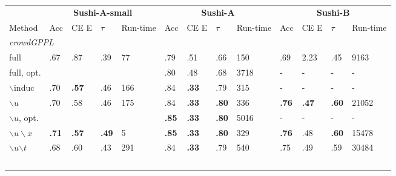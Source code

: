 \begin{table}
\small
\begin{tabularx}{\textwidth}{| p{1.1cm} | X | X | X | p{0.55cm} | X | X | X | p{0.7cm} | X | X | X | p{0.7cm} |}
\hline
& \multicolumn{4}{c|}{\textbf{Sushi-A-small}} & \multicolumn{4}{c|}{\textbf{Sushi-A}} & \multicolumn{4}{c|}{\textbf{Sushi-B}} \\ 
Method & Acc & CE E & $\tau$ & Run-time & Acc & CE E & $\tau$ & Run-time & Acc & CE E & $\tau$ & Run-time \\
\hline\hline
\multicolumn{13}{|l|}{\textit{crowdGPPL}} \\
full & .67 & .87 & .39 & 77%
& .79 & .51 & .66 & 150%
& .69 & 2.23 & .45 & 9163 
\\
full, opt. & & & & & .80 & .48 & .68 & 3718 
& - & - & - & - 
\\%
$\backslash $induc & .70 & \textbf{.57} & .46 & 166 %
& .84 & \textbf{.33} & .79 & 315 %
& - & - & - & -
\\
$\backslash u$ & .70 & .58 & .46 & 175 %
& .84 & \textbf{.33} & \textbf{.80} & 336 %
& \textbf{.76} & \textbf{.47} & \textbf{.60} & 21052
\\
$\backslash u$, opt. & & & & & \textbf{.85} & \textbf{.33} &  \textbf{.80} & 5016 %
& - & - & - & - \\
$\backslash u \backslash x$ & \textbf{.71} & \textbf{.57} & \textbf{.49} & 5 %
& \textbf{.85} & \textbf{.33} & \textbf{.80} & 329 %
& \textbf{.76} & .48 & \textbf{.60} & 15478
\\
$\backslash u$$\backslash t$ %
& .68 & .60 & .43 & 291 %
& .84 & \textbf{.33} & .79 & 540 %
& .75 & .49 & .59 & 30484
\\ 
$$
\end{tabularx}
\end{table}
